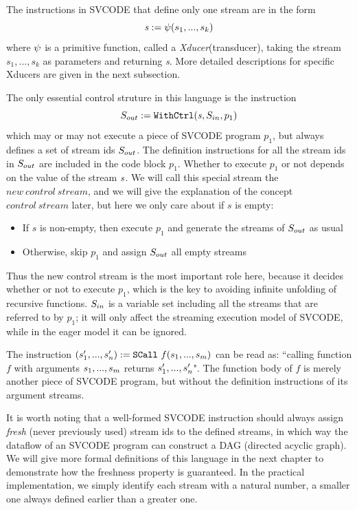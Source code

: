 The instructions in SVCODE that define only one stream are in the form
$$\sdef{\s}{\psi(s_1,...,s_k)} $$  
where $\lcall$ is a primitive function, called a \emph{Xducer}(transducer), taking the stream $s_1,...,s_k$ as parameters and returning \emph{s}. More detailed descriptions for specific Xducers are given in the next subsection.


The only essential control struture in this language is the \wc instruction 
$$\withctrl{\s}{p_1}{\Sin}{\Sout} $$
which may or may not execute a piece of SVCODE program $p_1$, but always defines a set of stream ids $\Sout$.
The definition instructions for all the stream ids in $\Sout$ are included in the code block $p_1$. 
Whether to execute $p_1$ or not depends on the value of the stream $\s$. We will call this special stream the $new \ control \ stream$, and we will give the explanation of the concept $control \ stream$ later, but here we only care about if $s$ is empty:
\begin{itemize}
	\item If $s$ is non-empty, then execute $p_1$ and generate the streams of $\Sout$ as usual
	\item Otherwise, skip $p_1$ and assign $\Sout$ all empty streams 
\end{itemize}
Thus the new control stream is the most important role here, because it decides whether or not to execute $p_1$, which is the key to avoiding infinite unfolding of recursive functions.  
$\Sin$ is a variable set including all the streams that are referred to by $p_1$;
it will only affect the streaming execution model of SVCODE, while in the eager model it can be ignored.

The instruction $\scall{f}{\replc{m}{s}}{(\replc{n}{s'})}$ can be read as: ``calling function $f$ with arguments $\replc{m}{s}$ returns $\replc{n}{s'}$". 
The function body of $f$ is merely another piece of SVCODE program, but without the definition instructions of its argument streams.


It is worth noting that a well-formed SVCODE instruction should always assign \emph{fresh} (never previously used) stream ids to the defined streams, in which way the dataflow of an SVCODE program can construct a DAG (directed acyclic graph). 
We will give more formal definitions of this language in the next chapter
to demonstrate how the freshness property is guaranteed. 
In the practical implementation, we simply identify each stream with a natural number, a smaller one always defined earlier than a greater one. 


